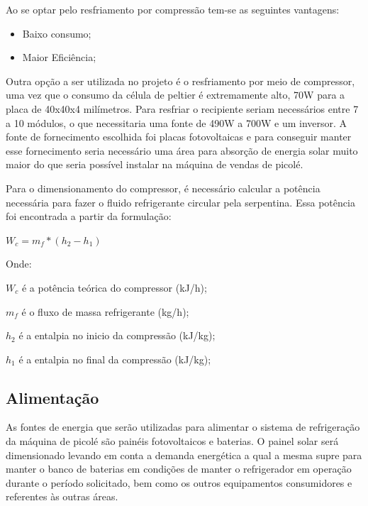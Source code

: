 Ao se optar pelo resfriamento por compressão tem-se as seguintes vantagens:

\begin{itemize}
\item Baixo consumo;

\item Maior Eficiência;
\end{itemize}


Outra opção a ser utilizada no projeto é o resfriamento por meio de compressor, uma vez que o consumo da célula de peltier é extremamente alto, 70W para a placa de 40x40x4 milímetros. Para resfriar o recipiente seriam necessários entre 7 a 10 módulos, o que necessitaria uma fonte de 490W a 700W e um inversor. A fonte de fornecimento escolhida foi placas fotovoltaicas e para conseguir manter esse fornecimento seria necessário uma área para absorção de energia solar muito maior do que seria possível instalar na máquina de vendas de picolé.


Para o dimensionamento do compressor, é necessário calcular a potência necessária para fazer o fluido refrigerante circular pela serpentina. Essa potência foi encontrada a
partir da formulação:

\begin{math} W_{c} = m_{f} * (h_{2} - h_{1})  \end{math}

Onde:

$W_{c}$ é a potência teórica do compressor (kJ/h);

$m_{f}$ é o fluxo de massa refrigerante (kg/h);

$h_{2}$ é a entalpia no inicio da compressão (kJ/kg);

$h_{1}$ é a entalpia no final da compressão (kJ/kg);


\subsection{Alimentação}
	As fontes de energia que serão utilizadas para alimentar o sistema de refrigeração da máquina de picolé são painéis fotovoltaicos e baterias. O painel solar será dimensionado levando em conta a demanda energética a qual a mesma supre para manter o banco de baterias em condições de manter o refrigerador em operação durante o período solicitado, bem como os outros equipamentos consumidores e referentes às outras áreas.

